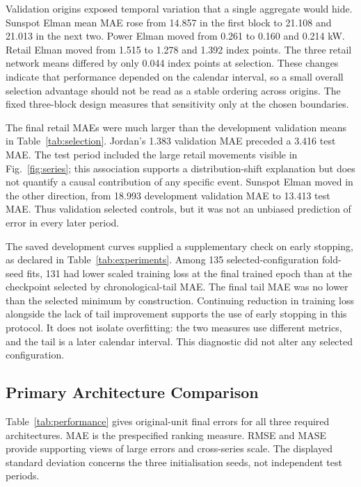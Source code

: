 Validation origins exposed temporal variation that a single aggregate would hide. Sunspot Elman mean MAE rose from 14.857 in the first block to 21.108 and 21.013 in the next two. Power Elman moved from 0.261 to 0.160 and 0.214 kW. Retail Elman moved from 1.515 to 1.278 and 1.392 index points. The three retail network means differed by only 0.044 index points at selection. These changes indicate that performance depended on the calendar interval, so a small overall selection advantage should not be read as a stable ordering across origins. The fixed three-block design measures that sensitivity only at the chosen boundaries.

The final retail MAEs were much larger than the development validation means in Table~\ref{tab:selection}. Jordan's 1.383 validation MAE preceded a 3.416 test MAE. The test period included the large retail movements visible in Fig.~\ref{fig:series}; this association supports a distribution-shift explanation but does not quantify a causal contribution of any specific event. Sunspot Elman moved in the other direction, from 18.993 development validation MAE to 13.413 test MAE. Thus validation selected controls, but it was not an unbiased prediction of error in every later period.

The saved development curves supplied a supplementary check on early stopping, as declared in Table~\ref{tab:experiments}. Among 135 selected-configuration fold-seed fits, 131 had lower scaled training loss at the final trained epoch than at the checkpoint selected by chronological-tail MAE. The final tail MAE was no lower than the selected minimum by construction. Continuing reduction in training loss alongside the lack of tail improvement supports the use of early stopping in this protocol. It does not isolate overfitting: the two measures use different metrics, and the tail is a later calendar interval. This diagnostic did not alter any selected configuration.

\subsection{Primary Architecture Comparison}
Table~\ref{tab:performance} gives original-unit final errors for all three required architectures. MAE is the prespecified ranking measure. RMSE and MASE provide supporting views of large errors and cross-series scale. The displayed standard deviation concerns the three initialisation seeds, not independent test periods.



